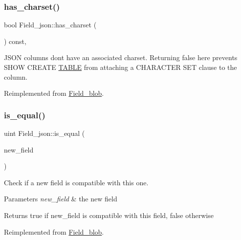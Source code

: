 \subsubsection{\texorpdfstring{has\+\_\+charset()}{has\_charset()}}
{\footnotesize\ttfamily bool Field\+\_\+json\+::has\+\_\+charset (\begin{DoxyParamCaption}\item[{void}]{ }\end{DoxyParamCaption}) const\hspace{0.3cm}{\ttfamily [inline]}, {\ttfamily [virtual]}}

J\+S\+ON columns don\textquotesingle{}t have an associated charset. Returning false here prevents S\+H\+OW C\+R\+E\+A\+TE \mbox{\hyperlink{structTABLE}{T\+A\+B\+LE}} from attaching a C\+H\+A\+R\+A\+C\+T\+ER S\+ET clause to the column. 

Reimplemented from \mbox{\hyperlink{classField__blob}{Field\+\_\+blob}}.

\mbox{\label{classField__json_a12d3ba38a6c987f627dce55780947578}} 
\subsubsection{\texorpdfstring{is\+\_\+equal()}{is\_equal()}}
{\footnotesize\ttfamily uint Field\+\_\+json\+::is\+\_\+equal (\begin{DoxyParamCaption}\item[{\mbox{\hyperlink{classCreate__field}{Create\+\_\+field}} $\ast$}]{new\+\_\+field }\end{DoxyParamCaption})\hspace{0.3cm}{\ttfamily [virtual]}}

Check if a new field is compatible with this one. 
\begin{DoxyParams}{Parameters}
{\em new\+\_\+field} & the new field \\
\hline
\end{DoxyParams}
\begin{DoxyReturn}{Returns}
true if new\+\_\+field is compatible with this field, false otherwise 
\end{DoxyReturn}


Reimplemented from \mbox{\hyperlink{classField__blob_aad2a7c5fe21d9c7cfd20aeea52c58ed5}{Field\+\_\+blob}}.

